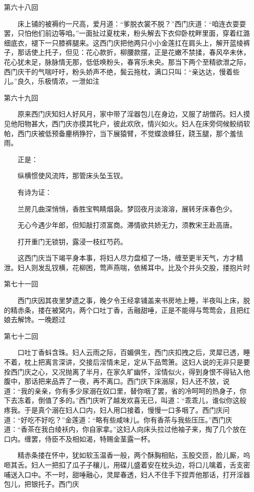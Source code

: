 第六十八回

　　床上铺的被褥约一尺高，爱月道：“爹脱衣裳不脱？”西门庆道：“咱连衣耍耍罢，只怕他们前边等咱。”一面扯过夏枕来，粉头解去下衣仰卧枕畔里面，穿着红潞细底衣，褪下一只膝裤腿来。这西门庆把他两只小小金莲扛在肩头上，解开蓝绫裤子，那话使上托子，但见：花心款折，柳腰款摆，正是花嫩不禁揉，春风卒未休，花心犹未足，脉脉情无那，低低唤粉头，春宵乐未央。那当下两个至精欲泄之际，西门庆干的气喘吁吁，粉头娇声不绝，鬓云拖枕，满口只叫：“亲达达，慢着些儿。”良久，乐极情浓，一泄如注


第六十九回

　　原来西门庆知妇人好风月，家中带了淫器包儿在身边，又服了胡僧药。妇人摸见他阳物甚大，西门庆亦摸其牝户，彼此欢欣，情兴如火。妇人在床旁伺候鲛绡软帕，西门庆被低预备麈柄狰狞，当下展猿臂，不觉蝶浪蜂狂，跷玉腿，那个羞怯雨。

　　正是：

　　纵横惯使风流阵，那管床头坠玉钗。

　　有诗为证：

　　兰房几曲深悄悄，香胜宝鸭睛烟袅。梦回夜月淡溶溶，展转牙床春色少。

　　无心今遇少年郎，但知敲打须富商。滞情欲共娇无力，须教宋王赴高唐。

　　打开重门无锁钥，露浸一枝红芍药。

　　这西门庆当下竭平身本事，将妇人尽力盘桓了一场，缠至更半天气，方才精泄。妇人则发乱钗横，花柳困，莺声燕喘，依稀耳中。比及个并头交股，搂抱片时


第七十一回

　　西门庆因其夜里梦遗之事，晚夕令王经拿铺盖来书房地上睡，半夜叫上床，脱的精赤条，搂在被窝内，两个口吐丁香，舌融甜唾，正是不能得与莺莺会，且把红娘去解馋。一晚题过


第七十二回

　　口吐丁香蚪含珠。妇人云雨之际，百媚俱生，西门庆扣拽之后，灵犀已透，睡不着，枕上把离言深讲，交接后淫情未足，定从下品莺箫。这妇人说的无非只是要拴西门庆之心，又况抛离了半月，在家久旷幽怀，淫情似火，得到身恨不得钻入他腹中，那话把来品弄了一夜，再不离口。西门庆下床溺尿，妇人还不放，说道：“我的亲亲，你有多少尿溺在奴口里，替你咽了罢，省的冷呵呵的热身子，你下去冻着，倒值了多的。”西门庆听了越发欢喜无已，叫道：“乖乖儿，谁似你这般疼我。于是真个溺在妇人口内，妇人用口接着，慢慢一口多咽了。西门庆问道：“好吃不好吃？”金莲道：“略有些咸味儿。你有香茶与我些压压。”西门庆道：“香茶在我白绫袄内，你自家拿。”这妇人向床头拉过他袖子来，掏了几个放在口内。缠罢，侍臣不及相如渴，特赐金茎露一杯。


　　精赤条搂在怀中，犹如软玉温香一般，两个酥胸相贴，玉股交匝，脸儿厮，呜咂其舌。妇人一把扣了瓜子子穰儿，用碟儿盛着安在枕头边，将口儿噙着，舌支密哺送入口中。不一时，甜唾融心，灵犀春透，妇人不住手下捏弄他那话，打开淫器包儿，把银托子。西门庆



